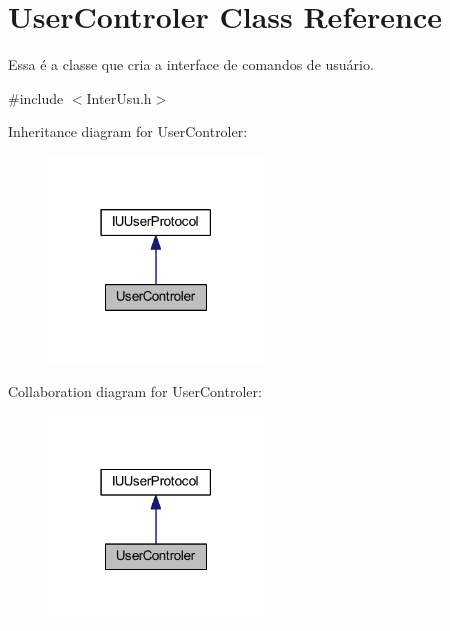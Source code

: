 \hypertarget{class_user_controler}{\section{User\-Controler Class Reference}
\label{class_user_controler}
}


Essa é a classe que cria a interface de comandos de usuário.  




{\ttfamily \#include $<$Inter\-Usu.\-h$>$}



Inheritance diagram for User\-Controler\-:
\nopagebreak
\begin{figure}[H]
\begin{center}
\leavevmode
\includegraphics[width=162pt]{class_user_controler__inherit__graph}
\end{center}
\end{figure}


Collaboration diagram for User\-Controler\-:
\nopagebreak
\begin{figure}[H]
\begin{center}
\leavevmode
\includegraphics[width=162pt]{class_user_controler__coll__graph}
\end{center}
\end{figure}
